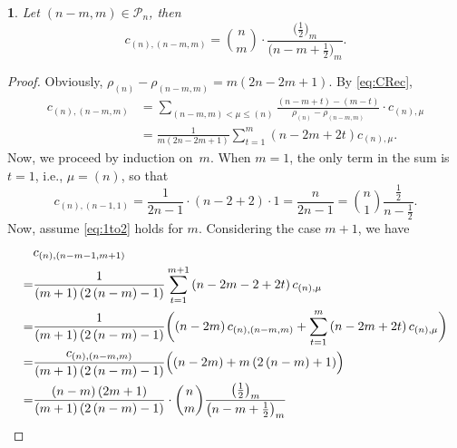 \documentclass{mathincs}
\numberwithin{equation}{section}
\numberwithin{figure}{section}
\theoremstyle{plain}
\newtheorem{thm}{\protect\theoremname}[section]
\theoremstyle{definition}
\theoremstyle{remark}
\theoremstyle{plain}
\theoremstyle{definition}
\theoremstyle{plain}
\theoremstyle{plain}
\providecommand{\theoremname}{Theorem}
\begin{document}
\begin{thm}\label{thm:row1}
Let $\left(n-m,m\right)\in\mathcal{P}_n$, then
\begin{equation}\label{eq:1to2}
  c_{\left(n\right),\left(n-m,m\right)} =
  \binom{n}{m}\cdot\frac{\bigl(\frac12\bigr)_m}{\bigl(n-m+\frac12\bigr)_m}.
\end{equation}
\end{thm}
\begin{proof}
Obviously, 
$ \rho_{\left(n\right)}-\rho_{\left(n-m,m\right)}=m\left(2n-2m+1\right)$. By \eqref{eq:CRec},
\begin{align*}
  c_{\left(n\right),\left(n-m,m\right)}
  &= \sum_{\left(n-m,m\right)<\mu\leq\left(n\right)}\frac{\left(n-m+t\right)-\left(m-t\right)}
    {\rho_{\left(n\right)}-\rho_{\left(n-m,m\right)}}\cdot c_{\left(n\right),\mu} \\
  &= \frac{1}{m\left(2n-2m+1\right)}\sum_{t=1}^{m}\left(n-2m+2t\right)c_{\left(n\right),\mu}.
\end{align*}
Now, we proceed by induction on~$m$. When $m=1$, the only term in the sum is $t=1$, i.e., $\mu=(n)$,  so that
\begin{equation}\label{eq:cnton1}
  c_{\left(n\right),\left(n-1,1\right)}=\frac{1}{2n-1}\cdot\left(n-2+2\right)\cdot1=\frac{n}{2n-1}=\binom{n}{1}\frac{\frac{1}{2}}{n-\frac{1}{2}}.
\end{equation}
Now, assume \eqref{eq:1to2} holds for $m$. Considering the case $m+1$, we have
\begin{align*}
 & c_{\left(n\right),\left(n-m-1,m+1\right)}  \\
 =& \frac{1}{\left(m+1\right)\left(2\left(n-m\right)-1\right)}\sum_{t=1}^{m+1}\left(n-2m-2+2t\right)c_{\left(n\right),\mu}\\
= & \frac{1}{\left(m+1\right)\left(2\left(n-m\right)-1\right)}\biggl(\left(n-2m\right)c_{\left(n\right),\left(n-m,m\right)}+\sum_{t=1}^{m}\left(n-2m+2t\right)c_{\left(n\right),\mu}\biggr)\\
=& \frac{c_{\left(n\right),\left(n-m,m\right)}}{\left(m+1\right)\left(2\left(n-m\right)-1\right)}\Bigl(\left(n-2m\right)+m\left(2\left(n-m\right)+1\right)\Bigr) \\
=& \frac{\left(n-m\right)\left(2m+1\right)}{\left(m+1\right)\left(2\left(n-m\right)-1\right)}\cdot\binom{n}{m}\frac{\bigl(\frac12\bigr)_m}{\bigl(n-m+\frac12\bigr)_m}

\end{align*}
\end{proof}
\end{document}
